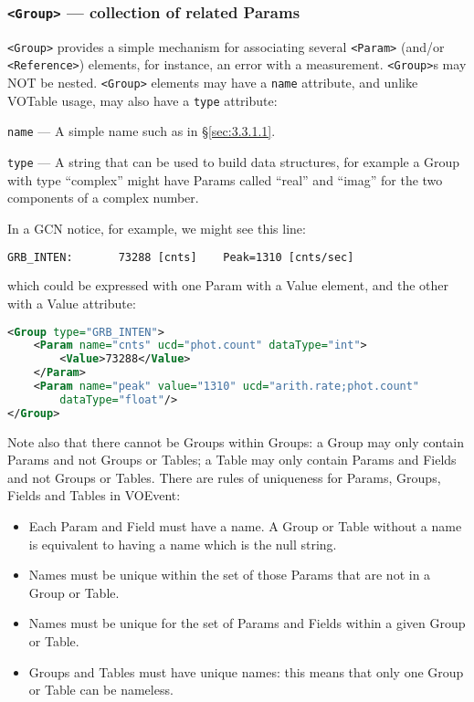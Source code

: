 \documentclass[11pt,a4paper]{ivoa}
\begin{document}
\subsubsection{{\tt <Group>} --- collection of related Params}
\label{sec:3.3.2}
{\tt <Group>} provides a simple mechanism for associating several {\tt <Param>}
(and/or {\tt <Reference>}) elements, for instance, an error with a measurement.
{\tt <Group>}s may NOT be nested. {\tt <Group>} elements may have a {\tt name}
attribute, and unlike VOTable usage, may also have a {\tt type} attribute:

 {\tt name}\label{sec:3.3.2.1} --- A simple name such as
in \S\ref{sec:3.3.1.1}.

 {\tt type}\label{sec:3.3.2.2} --- A string that can be
used to build data structures, for example a Group with type ``complex'' might
have Params called ``real'' and ``imag'' for the two components of a complex
number.

In a GCN notice, for example, we might see this line:
\begin{lstlisting}[language=XML]
GRB_INTEN:       73288 [cnts]    Peak=1310 [cnts/sec]
\end{lstlisting}
which could be expressed with one Param with a Value element, and the other with
a Value attribute:
\begin{lstlisting}[language=XML]
<Group type="GRB_INTEN">
    <Param name="cnts" ucd="phot.count" dataType="int">
        <Value>73288</Value>
    </Param>
    <Param name="peak" value="1310" ucd="arith.rate;phot.count"
        dataType="float"/>
</Group>
\end{lstlisting}
Note also that there cannot be Groups within Groups: a Group may only contain
Params and not Groups or Tables; a Table may only contain Params and Fields and
not Groups or Tables. There are rules of uniqueness for Params, Groups, Fields
and Tables in VOEvent:
\begin{itemize}
\item Each Param and Field must have a name. A Group or Table without a name is
equivalent to having a name which is the null string.
\item Names must be unique within the set of those Params that are not in a
Group or Table.
\item Names must be unique for the set of Params and Fields within a given Group
or Table.
\item Groups and Tables must have unique names: this means that only one Group
or Table can be nameless.
\end{itemize}
\end{document}

